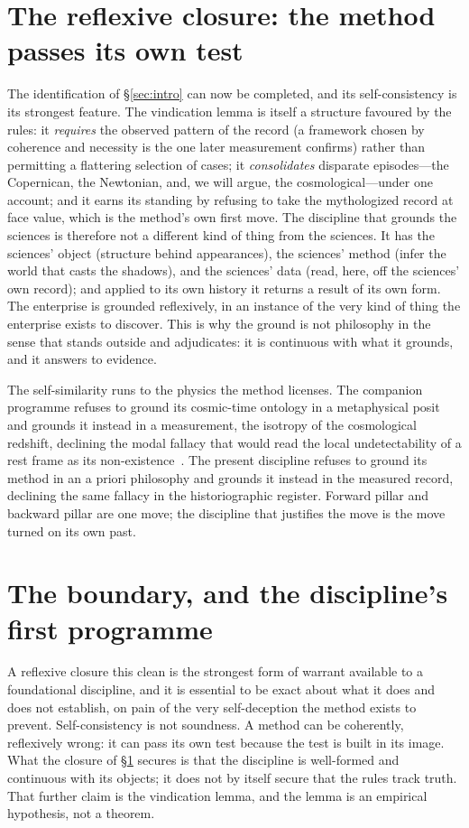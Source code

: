 \documentclass[11pt,a4paper]{article}
\begin{document}
\section{The reflexive closure: the method passes its own test}\label{sec:reflexive}

The identification of \S\ref{sec:intro} can now be completed, and its self-consistency is its strongest feature. The vindication lemma is itself a structure favoured by the rules: it \emph{requires} the observed pattern of the record (a framework chosen by coherence and necessity is the one later measurement confirms) rather than permitting a flattering selection of cases; it \emph{consolidates} disparate episodes---the Copernican, the Newtonian, and, we will argue, the cosmological---under one account; and it earns its standing by refusing to take the mythologized record at face value, which is the method's own first move. The discipline that grounds the sciences is therefore not a different kind of thing from the sciences. It has the sciences' object (structure behind appearances), the sciences' method (infer the world that casts the shadows), and the sciences' data (read, here, off the sciences' own record); and applied to its own history it returns a result of its own form. The enterprise is grounded reflexively, in an instance of the very kind of thing the enterprise exists to discover. This is why the ground is not philosophy in the sense that stands outside and adjudicates: it is continuous with what it grounds, and it answers to evidence.

The self-similarity runs to the physics the method licenses. The companion programme refuses to ground its cosmic-time ontology in a metaphysical posit and grounds it instead in a measurement, the isotropy of the cosmological redshift, declining the modal fallacy that would read the local undetectability of a rest frame as its non-existence~\cite{JanzenModernParallax}. The present discipline refuses to ground its method in an a priori philosophy and grounds it instead in the measured record, declining the same fallacy in the historiographic register. Forward pillar and backward pillar are one move; the discipline that justifies the move is the move turned on its own past.

\section{The boundary, and the discipline's first programme}\label{sec:boundary}

A reflexive closure this clean is the strongest form of warrant available to a foundational discipline, and it is essential to be exact about what it does and does not establish, on pain of the very self-deception the method exists to prevent. Self-consistency is not soundness. A method can be coherently, reflexively wrong: it can pass its own test because the test is built in its image. What the closure of \S\ref{sec:reflexive} secures is that the discipline is well-formed and continuous with its objects; it does not by itself secure that the rules track truth. That further claim is the vindication lemma, and the lemma is an empirical hypothesis, not a theorem.
\end{document}
